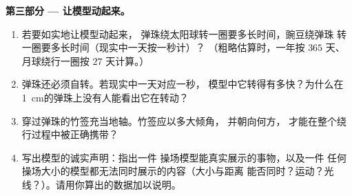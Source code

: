 \begin{problem}
\medskip\noindent\textbf{第三部分 --- 让模型动起来。}
\begin{enumerate}[resume]
  \item 若要如实地让模型动起来，
        弹珠绕太阳球转一圈要多长时间，豌豆绕弹珠
        转一圈要多长时间（现实中一天按一秒计）？
        （粗略估算时，一年按 $365$ 天、月球绕行一圈按 $27$
        天计算。）
  \item 弹珠还必须自转。若现实中一天对应一秒，
        模型中它转得有多快？为什么在
        \qty{1}{cm}的弹珠上没有人能看出它在转动？
  \item 穿过弹珠的竹签充当地轴。竹签应以多大倾角，
        并朝向何方，
        才能在整个绕行过程中被正确携带？
  \item 写出模型的诚实声明：指出一件
        操场模型能真实展示的事物，以及一件
        任何操场大小的模型都无法同时展示的内容（大小与距离
        能否同时？运动？光线？）。请用你算出的数据加以说明。
\end{enumerate}
\end{problem}
